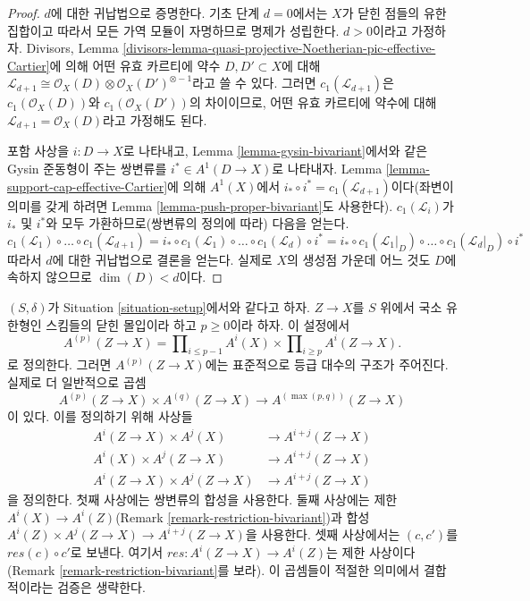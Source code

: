 \begin{proof}
$d$에 대한 귀납법으로 증명한다. 기초 단계 $d = 0$에서는 $X$가 닫힌
점들의 유한 집합이고 따라서 모든 가역 모듈이 자명하므로 명제가
성립한다. $d > 0$이라고 가정하자. Divisors, Lemma
\ref{divisors-lemma-quasi-projective-Noetherian-pic-effective-Cartier}에
의해 어떤 유효 카르티에 약수 $D, D' \subset X$에 대해
$\mathcal{L}_{d + 1} \cong \mathcal{O}_X(D) \otimes
\mathcal{O}_X(D')^{\otimes -1}$라고 쓸 수 있다. 그러면
$c_1(\mathcal{L}_{d + 1})$은 $c_1(\mathcal{O}_X(D))$와
$c_1(\mathcal{O}_X(D'))$의 차이이므로, 어떤 유효 카르티에 약수에 대해
$\mathcal{L}_{d + 1} = \mathcal{O}_X(D)$라고 가정해도 된다.

\medskip\noindent
포함 사상을 $i : D \to X$로 나타내고, Lemma
\ref{lemma-gysin-bivariant}에서와 같은 Gysin 준동형이 주는 쌍변류를
$i^* \in A^1(D \to X)$로 나타내자. Lemma
\ref{lemma-support-cap-effective-Cartier}에 의해 $A^1(X)$에서
$i_* \circ i^* = c_1(\mathcal{L}_{d + 1})$이다(좌변이 의미를 갖게 하려면
Lemma \ref{lemma-push-proper-bivariant}도 사용한다).
$c_1(\mathcal{L}_i)$가 $i_*$ 및 $i^*$와 모두 가환하므로(쌍변류의 정의에
따라) 다음을 얻는다.
$$
c_1(\mathcal{L}_1) \circ \ldots \circ c_1(\mathcal{L}_{d + 1}) =
i_* \circ c_1(\mathcal{L}_1) \circ \ldots \circ c_1(\mathcal{L}_d) \circ i^* =
i_* \circ c_1(\mathcal{L}_1|_D) \circ \ldots \circ c_1(\mathcal{L}_d|_D)
\circ i^*
$$
따라서 $d$에 대한 귀납법으로 결론을 얻는다. 실제로 $X$의 생성점
가운데 어느 것도 $D$에 속하지 않으므로 $\dim(D) < d$이다.
\end{proof}

\begin{remark}
\label{remark-ring-loc-classes}
$(S, \delta)$가 Situation \ref{situation-setup}에서와 같다고 하자.
$Z \to X$를 $S$ 위에서 국소 유한형인 스킴들의 닫힌 몰입이라 하고
$p \geq 0$이라 하자. 이 설정에서
$$
A^{(p)}(Z \to X) =
\prod\nolimits_{i \leq p - 1} A^i(X) \times
\prod\nolimits_{i \geq p} A^i(Z \to X).
$$
로 정의한다. 그러면 $A^{(p)}(Z \to X)$에는 표준적으로 등급 대수의
구조가 주어진다. 실제로 더 일반적으로 곱셈
$$
A^{(p)}(Z \to X) \times A^{(q)}(Z \to X)
\longrightarrow A^{(\max(p, q))}(Z \to X)
$$
이 있다. 이를 정의하기 위해 사상들
\begin{align*}
A^i(Z \to X) \times A^j(X) & \to A^{i + j}(Z \to X) \\
A^i(X) \times A^j(Z \to X) & \to A^{i + j}(Z \to X) \\
A^i(Z \to X) \times A^j(Z \to X) & \to A^{i + j}(Z \to X)
\end{align*}
을 정의한다. 첫째 사상에는 쌍변류의 합성을 사용한다. 둘째 사상에는
제한 $A^i(X) \to A^i(Z)$(Remark \ref{remark-restriction-bivariant})과
합성 $A^i(Z) \times A^j(Z \to X) \to A^{i + j}(Z \to X)$을 사용한다.
셋째 사상에서는 $(c, c')$를 $res(c) \circ c'$로 보낸다. 여기서
$res : A^i(Z \to X) \to A^i(Z)$는 제한 사상이다(Remark
\ref{remark-restriction-bivariant}를 보라). 이 곱셈들이 적절한 의미에서
결합적이라는 검증은 생략한다.
\end{remark}

